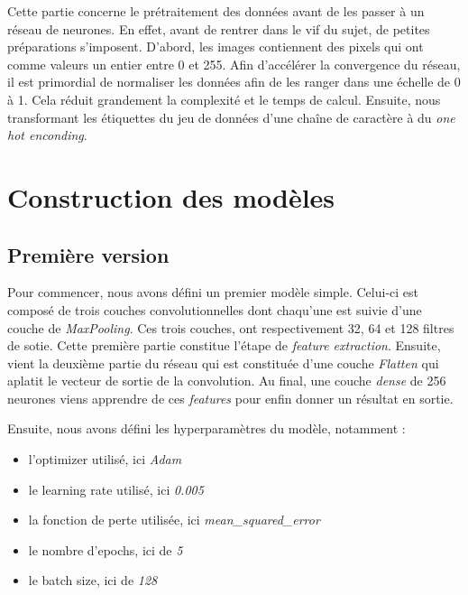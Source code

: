 \documentclass[12pt,titlepage]{article}
\begin{document}
Cette partie concerne le prétraitement des données avant de les passer à un réseau de neurones. En effet, avant de rentrer dans le vif du sujet, de petites préparations s'imposent. D'abord, les images contiennent des pixels qui ont comme valeurs un entier entre 0 et 255. Afin d'accélérer la convergence du réseau, il est primordial de normaliser les données afin de les ranger dans une échelle de 0 à 1. Cela réduit grandement la complexité et le temps de calcul. Ensuite, nous transformant les étiquettes du jeu de données d'une chaîne de caractère à du \textit{one hot enconding}.


\section{Construction des modèles}

\subsection{Première version}

Pour commencer, nous avons défini un premier modèle simple. Celui-ci est composé de trois couches convolutionnelles dont chaqu'une est suivie d'une couche de \textit{MaxPooling}. Ces trois couches, ont respectivement 32, 64 et 128 filtres de sotie. Cette première partie constitue l'étape de \textit{feature extraction}. Ensuite, vient la deuxième partie du réseau qui est constituée d'une couche \textit{Flatten} qui aplatit le vecteur de sortie de la convolution. Au final, une couche \textit{dense} de 256 neurones viens apprendre de ces \textit{features} pour enfin donner un résultat en sortie.

Ensuite, nous avons défini les hyperparamètres du modèle, notamment :

\begin{itemize}


\item l'optimizer utilisé, ici \textit{Adam}


\item le learning rate utilisé, ici \textit{0.005}


\item la fonction de perte utilisée, ici \textit{mean\_squared\_error}


\item le nombre d'epochs, ici de \textit{5}


\item le batch size, ici de \textit{128}

\end{itemize}
\end{document}
